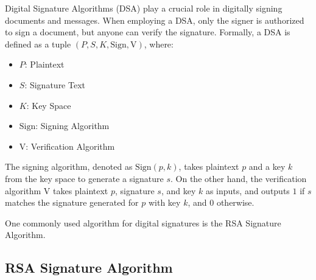 \documentclass[11pt]{article}
\begin{document}

Digital Signature Algorithms (DSA) play a crucial role in digitally signing documents and messages. When employing a DSA, only the signer is authorized to sign a document, but anyone can verify the signature. Formally, a DSA is defined as a tuple $(P, S, K, \text{Sign}, \text{V})$, where:

\begin{itemize}
    \item $P$: Plaintext
    \item $S$: Signature Text
    \item $K$: Key Space
    \item $\text{Sign}$: Signing Algorithm
    \item $\text{V}$: Verification Algorithm
\end{itemize}

The signing algorithm, denoted as $\text{Sign}(p, k)$, takes plaintext $p$ and a key $k$ from the key space to generate a signature $s$. On the other hand, the verification algorithm $\text{V}$ takes plaintext $p$, signature $s$, and key $k$ as inputs, and outputs $1$ if $s$ matches the signature generated for $p$ with key $k$, and $0$ otherwise.

One commonly used algorithm for digital signatures is the RSA Signature Algorithm.


\subsection{RSA Signature Algorithm}
\end{document}
